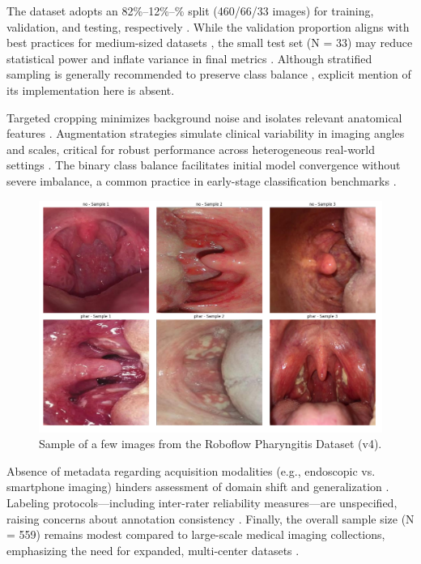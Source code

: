 The dataset adopts an 82\%–12\%–\% split (460/66/33 images) for training, validation, and testing, respectively \cite{robo}. While the validation proportion aligns with best practices for medium-sized datasets \cite{encord2024}, the small test set (N = 33) may reduce statistical power and inflate variance in final metrics \cite{wilb}. Although stratified sampling is generally recommended to preserve class balance \cite{encord2024}, explicit mention of its implementation here is absent.

Targeted cropping minimizes background noise and isolates relevant anatomical features \cite{encord2024}. Augmentation strategies simulate clinical variability in imaging angles and scales, critical for robust performance across heterogeneous real-world settings \cite{wilb}. The binary class balance facilitates initial model convergence without severe imbalance, a common practice in early-stage classification benchmarks \cite{radimagenet2021}.

\begin{figure}
    \centering
    \includegraphics[width=1\textwidth]{images/roboflow_samples.png}
    \caption{Sample of a few images from the Roboflow Pharyngitis Dataset (v4).}
    \label{fig:roboflow_samples}
\end{figure}

Absence of metadata regarding acquisition modalities (e.g., endoscopic vs. smartphone imaging) hinders assessment of domain shift and generalization \cite{wilb}. Labeling protocols—including inter-rater reliability measures—are unspecified, raising concerns about annotation consistency \cite{encord2024}. Finally, the overall sample size (N = 559) remains modest compared to large-scale medical imaging collections, emphasizing the need for expanded, multi-center datasets \cite{robo}.

